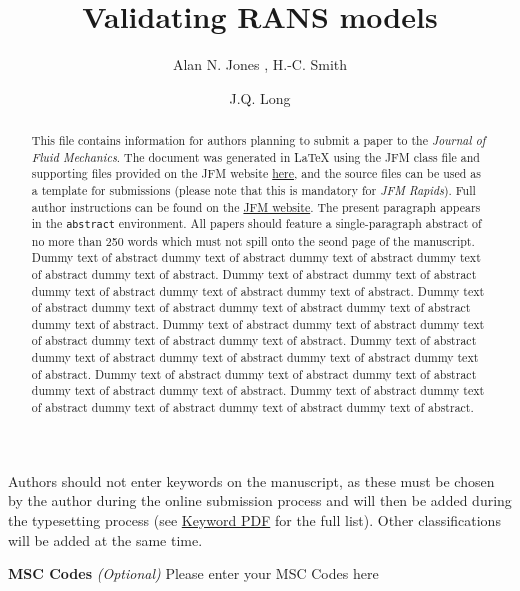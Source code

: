\documentclass[lineno]{jfm}
\title{Validating RANS models}
\author{Alan N. Jones\aff{1}
  \corresp{\email{JFMEditorial@cambridge.org}},
  H.-C. Smith\aff{1}
 \and J.Q. Long\aff{2}}
\affiliation{\aff{1}STM Journals, Cambridge University Press, The Printing House, Shaftesbury Road, Cambridge CB2 8BS, UK
\aff{2}DAMTP, Centre for Mathematical Sciences, Wilberforce Road, Cambridge CB3 0WA, UK}
\begin{document}
\maketitle

\begin{abstract}
This file contains information for authors planning to submit a paper to the {\it Journal of Fluid Mechanics}. The document was generated in {\LaTeX} using the JFM class file and supporting files provided on the JFM website \href{https://www.cambridge.org/core/journals/journal-of-fluid-mechanics/information/author-instructions/preparing-your-materials}{here}, and the source files can be used as a template for submissions (please note that this is mandatory for {\it JFM Rapids}). Full author instructions can be found on the \href{https://www.cambridge.org/core/journals/journal-of-fluid-mechanics/information/author-instructions}{JFM website}. The present paragraph appears in the \verb}abstract} environment. All papers should feature a single-paragraph abstract of no more than 250 words which must not spill onto the seond page of the manuscript. Dummy text of abstract dummy text of abstract dummy text of abstract dummy text of abstract dummy text of abstract. Dummy text of abstract dummy text of abstract dummy text of abstract dummy text of abstract dummy text of abstract. Dummy text of abstract dummy text of abstract dummy text of abstract dummy text of abstract dummy text of abstract. Dummy text of abstract dummy text of abstract dummy text of abstract dummy text of abstract dummy text of abstract. Dummy text of abstract dummy text of abstract dummy text of abstract dummy text of abstract dummy text of abstract. Dummy text of abstract dummy text of abstract dummy text of abstract dummy text of abstract dummy text of abstract. Dummy text of abstract dummy text of abstract dummy text of abstract dummy text of abstract dummy text of abstract.
\end{abstract}

\begin{keywords}
Authors should not enter keywords on the manuscript, as these must be chosen by the author during the online submission process and will then be added during the typesetting process (see \href{https://www.cambridge.org/core/journals/journal-of-fluid-mechanics/information/list-of-keywords}{Keyword PDF} for the full list).  Other classifications will be added at the same time.
\end{keywords}

{\bf MSC Codes }  {\it(Optional)} Please enter your MSC Codes here
\end{document}
